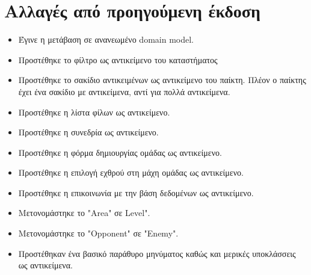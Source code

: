 \section*{Αλλαγές από προηγούμενη έκδοση}
\begin{itemize}
    \item Έγινε η μετάβαση σε ανανεωμένο domain model.
    \item Προστέθηκε το φίλτρο ως αντικείμενο του καταστήματος
    \item Προστέθηκε το σακίδιο αντικειμένων ως αντικείμενο του παίκτη. Πλέον ο παίκτης έχει ένα σακίδιο με αντικείμενα, αντί για πολλά αντικείμενα.
    \item Προστέθηκε η λίστα φίλων ως αντικείμενο.
    \item Προστέθηκε η συνεδρία ως αντικείμενο.
    \item Προστέθηκε η φόρμα δημιουργίας ομάδας ως αντικείμενο.
    \item Προστέθηκε η επιλογή εχθρού στη μάχη ομάδας ως αντικείμενο.
    \item Προστέθηκε η επικοινωνία με την βάση δεδομένων ως αντικείμενο.
    \item Μετονομάστηκε το "Area" σε Level".
    \item Μετονομάστηκε το "Opponent" σε "Enemy".
    \item Προστέθηκαν ένα βασικό παράθυρο μηνύματος καθώς και μερικές υποκλάσσεις ως αντικείμενα.
\end{itemize}

\clearpage